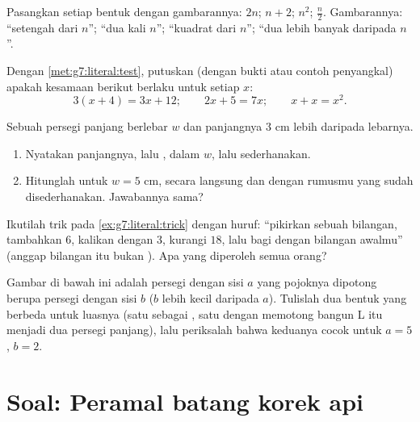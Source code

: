 \begin{exercise}[$\star$]\label{exo:g7:literal:7}
Pasangkan setiap bentuk dengan gambarannya: $2n$; $n + 2$; $n^2$;
$\frac n2$. Gambarannya: ``setengah dari $n$''; ``dua kali $n$'';
``kuadrat dari $n$''; ``dua lebih banyak daripada $n$''.
\end{exercise}

\begin{exercise}[$\star\star$]\label{exo:g7:literal:8}
Dengan \cref{met:g7:literal:test}, putuskan (dengan bukti atau contoh
penyangkal) apakah kesamaan berikut berlaku untuk setiap $x$:
\[
3(x + 4) = 3x + 12; \qquad
2x + 5 = 7x; \qquad
x + x = x^2 .
\]
\end{exercise}

\begin{exercise}[$\star\star$]\label{exo:g7:literal:9}
Sebuah persegi panjang berlebar $w$ dan panjangnya $3$ cm lebih
daripada lebarnya.
\begin{enumerate}
  \item Nyatakan panjangnya, lalu , dalam $w$, lalu
        sederhanakan.
  \item Hitunglah  untuk $w = 5$ cm, secara langsung dan
        dengan rumusmu yang sudah disederhanakan. Jawabannya sama?
\end{enumerate}
\end{exercise}

\begin{exercise}[$\star\star$]\label{exo:g7:literal:10}
Ikutilah trik pada \cref{ex:g7:literal:trick} dengan huruf: ``pikirkan
sebuah bilangan, tambahkan $6$, kalikan dengan $3$, kurangi $18$, lalu
bagi dengan bilangan awalmu'' (anggap bilangan itu bukan ). Apa yang
diperoleh semua orang?
\end{exercise}

\begin{exercise}[$\star\star\star$]\label{exo:g7:literal:11}
Gambar di bawah ini adalah persegi dengan sisi $a$ yang pojoknya
dipotong berupa persegi dengan sisi $b$ ($b$ lebih kecil daripada
$a$). Tulislah dua bentuk yang berbeda untuk luasnya (satu sebagai
, satu dengan memotong bangun L itu menjadi dua persegi
panjang), lalu periksalah bahwa keduanya cocok untuk $a = 5$, $b = 2$.
\end{exercise}

\section{Soal: Peramal batang korek api}

